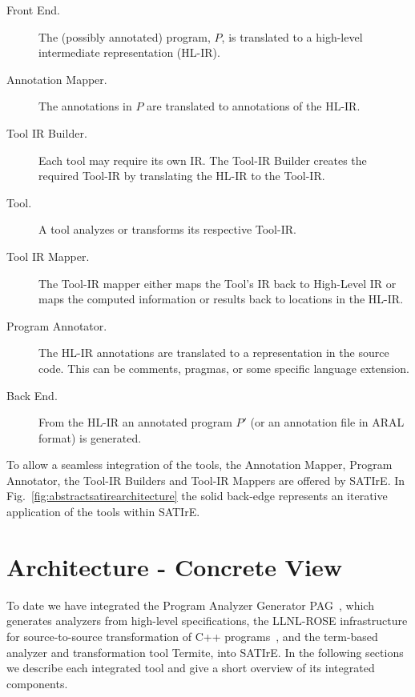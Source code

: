 \documentclass[a4paper,12pt]{report}
\newcommand{\satire}[0]{SATIrE}
\begin{document}
\begin{description}
\item [Front End.] The (possibly annotated) program, $P$, is translated to a high-level intermediate representation (HL-IR).
\item [Annotation Mapper.] The annotations in $P$ are translated to annotations of the HL-IR.
\item [Tool IR Builder.] Each tool may require its own IR. The Tool-IR Builder creates the required Tool-IR by translating the HL-IR to the Tool-IR.
\item [Tool.] A tool analyzes or transforms its respective Tool-IR.
\item [Tool IR Mapper.] The Tool-IR mapper either maps the Tool's IR
back to High-Level IR or maps the computed information or results back
to locations in the HL-IR.
\item [Program Annotator.] The HL-IR annotations are translated to a representation in the source code. This can be comments, pragmas, or some specific language extension.
\item [Back End.] From the HL-IR an annotated program $P'$ (or an annotation file in ARAL format) is generated.
\end{description}

To allow a seamless integration of the tools, the Annotation Mapper,
Program Annotator, the Tool-IR Builders and Tool-IR Mappers are
offered by SATIrE. In Fig.~\ref{fig:abstractsatirearchitecture} the
solid back-edge represents an iterative application of the tools
within SATIrE.

\section{Architecture - Concrete View}
\label{sec:concretearchitecture}

To date we have integrated the Program Analyzer
Generator PAG~\cite{pag}, which generates analyzers from
high-level specifications, the LLNL-ROSE infrastructure for
source-to-source transformation of C++ programs~\cite{ROSE}, and
the term-based analyzer and transformation tool Termite, into \satire.
In the following sections we describe each integrated tool and give a
short overview of its integrated components.
\end{document}
